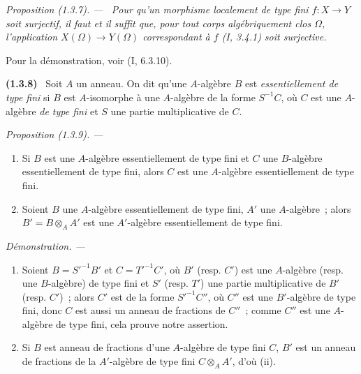 \documentclass[10pt,oneside]{book}
\makeatletter
\newcommand{\setmanualcurrentlabel}[1]{\def\@currentlabel{#1}}
\newenvironment{env}[1][]{\setmanualcurrentlabel{#1}\par\medskip\noindent\textbf{(#1)}\ }{\par}
\newenvironment{proposition}[1][]{%
  \setmanualcurrentlabel{#1}\par\medskip\noindent\itshape Proposition (#1). ---\ }{\par}
\newenvironment{proof}{%
  \par\medskip\noindent\textit{Démonstration. ---\ }}{\par}
\makeatother
\begin{document}
\begin{proposition}[1.3.7]
\label{IV.1.3.7-fr}
Pour qu'un morphisme localement de type fini $f:X\to Y$ soit surjectif, il
faut et il suffit que, pour tout corps algébriquement clos $\Omega$,
l'application $X(\Omega)\to Y(\Omega)$ correspondant à $f$ (I, 3.4.1) soit
surjective.
\end{proposition}

Pour la démonstration, voir (I, 6.3.10).

\begin{env}[1.3.8]
\label{IV.1.3.8-fr}
Soit $A$ un anneau. On dit qu'une $A$-algèbre $B$ est \emph{essentiellement de
type fini} si $B$ est $A$-isomorphe à une $A$-algèbre de la forme $S^{-1}C$,
où $C$ est une $A$-algèbre \emph{de type fini} et $S$ une partie multiplicative
de $C$.
\end{env}

\par\medskip\noindent
\begin{proposition}[1.3.9]
\label{IV.1.3.9-fr}
\begin{enumerate}
  \item[(i)] Si $B$ est une $A$-algèbre essentiellement de type fini et $C$
  une $B$-algèbre essentiellement de type fini, alors $C$ est une
  $A$-algèbre essentiellement de type fini.
  \item[(ii)] Soient $B$ une $A$-algèbre essentiellement de type fini, $A'$
  une $A$-algèbre~; alors $B'=B\otimes_AA'$ est une $A'$-algèbre
  essentiellement de type fini.
\end{enumerate}
\end{proposition}

\begin{proof}
\begin{enumerate}
  \item[(i)] Soient $B=S'^{-1}B'$ et $C=T'^{-1}C'$, où $B'$ (resp. $C'$) est
  une $A$-algèbre (resp. une $B$-algèbre) de type fini et $S'$ (resp. $T'$)
  une partie multiplicative de $B'$ (resp. $C'$)~; alors $C'$ est de la forme
  $S'^{-1}C''$, où $C''$ est une $B'$-algèbre de type fini, donc $C$ est aussi
  un anneau de fractions de $C''$~; comme $C''$ est une $A$-algèbre de type
  fini, cela prouve notre assertion.
  \item[(ii)] Si $B$ est anneau de fractions d'une $A$-algèbre de type fini
  $C$, $B'$ est un anneau de fractions de la $A'$-algèbre de type fini
  $C\otimes_AA'$, d'où (ii).
\end{enumerate}
\end{proof}
\end{document}
